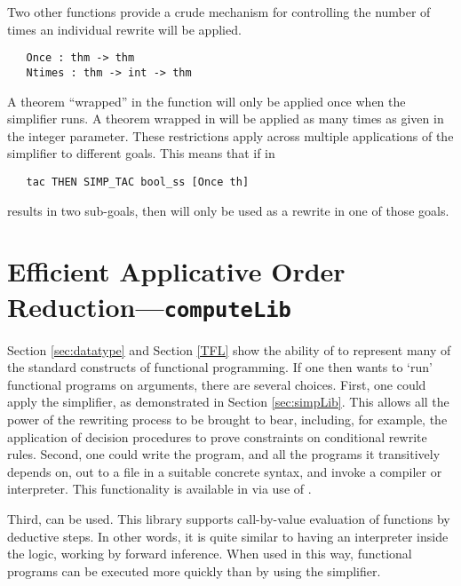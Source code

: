 {Two other functions provide a crude mechanism for controlling the
number of times an individual rewrite will be applied.
\begin{hol}
\begin{verbatim}
   Once : thm -> thm
   Ntimes : thm -> int -> thm
\end{verbatim}
\end{hol}
A theorem ``wrapped'' in the  function will only be applied
once when the simplifier runs.  A theorem wrapped in  will
be applied as many times as given in the integer parameter.  These
restrictions apply across multiple applications of the simplifier to
different goals.  This means that if  in
\begin{hol}
\begin{verbatim}
   tac THEN SIMP_TAC bool_ss [Once th]
\end{verbatim}
\end{hol}
results in two sub-goals, then  will only be used as a rewrite
in one of those goals.


\section{Efficient Applicative Order Reduction---\texttt{computeLib}}
\label{sec:computeLib}

Section \ref{sec:datatype} and Section \ref{TFL} show the ability of
\HOL{} to represent many of the standard constructs of functional
programming. If one then wants to `run' functional programs on
arguments, there are several choices. First, one could apply the
simplifier, as demonstrated in Section \ref{sec:simpLib}. This allows
all the power of the rewriting process to be brought to bear,
including, for example, the application of decision procedures to
prove constraints on conditional rewrite rules.  Second, one could
write the program, and all the programs it transitively depends on,
out to a file in a suitable concrete syntax, and invoke a compiler or
interpreter. This functionality is available in \HOL{} via use of
.

Third,  can be used. This library supports call-by-value
evaluation of \HOL{} functions by deductive steps. In other words, it
is quite similar to having an \ML{} interpreter inside the \HOL{} logic,
working by forward inference. When used in this way, functional
programs can be executed more quickly than by using the simplifier.

}
